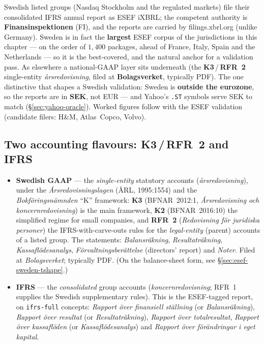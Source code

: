 \documentclass[11pt,a4paper]{report}
\begin{document}
Swedish listed groups (Nasdaq Stockholm and the regulated markets) file their consolidated IFRS annual report
as ESEF iXBRL; the competent authority is \textbf{Finansinspektionen} (FI), and the reports are carried by
filings.xbrl.org (unlike Germany). Sweden is in fact the \textbf{largest} ESEF corpus of the jurisdictions in
this chapter --- on the order of \(1{,}400\) packages, ahead of France, Italy, Spain and the Netherlands --- so
it is the best-covered, and the natural anchor for a validation pass. As elsewhere a national-GAAP layer sits
underneath (the \textbf{K3}\,/\,\textbf{RFR~2} single-entity \emph{\aa rsredovisning}, filed at
\textbf{Bolagsverket}, typically PDF). The one distinctive that shapes a Swedish validation: Sweden is
\textbf{outside the eurozone}, so the reports are in \textbf{SEK}, not EUR --- and Yahoo's \texttt{.ST} symbols
serve SEK to match (\S\ref{sec:yahoo-oracle}). Worked figures follow with the ESEF validation (candidate
filers: H\&M, Atlas~Copco, Volvo).

\subsection{Two accounting flavours: K3\,/\,RFR~2 and IFRS}

\begin{itemize}
  \item \textbf{Swedish GAAP} --- the \emph{single-entity} statutory accounts (\emph{\aa rsredovisning}), under
    the \emph{\AA rsredovisningslagen} (ÅRL, 1995:1554) and the \emph{Bokf\"oringsn\"amnden} ``K'' framework:
    \textbf{K3} (BFNAR~2012:1, \emph{\AA rsredovisning och koncernredovisning}) is the main framework, \textbf{K2}
    (BFNAR~2016:10) the simplified regime for small companies, and \textbf{RFR~2} (\emph{Redovisning f\"or
    juridiska personer}) the IFRS-with-carve-outs rules for the \emph{legal-entity} (parent) accounts of a
    listed group. The statements: \emph{Balansr\"akning}, \emph{Resultatr\"akning}, \emph{Kassafl\"odesanalys},
    \emph{F\"orvaltningsber\"attelse} (directors' report) and \emph{Noter}. Filed at \emph{Bolagsverket};
    typically PDF. (On the balance-sheet form, see \S\ref{sec:esef-sweden-tshape}.)
  \item \textbf{IFRS} --- the \emph{consolidated} group accounts (\emph{koncernredovisning}; RFR~1 supplies the
    Swedish supplementary rules). This is the ESEF-tagged report, on \texttt{ifrs-full} concepts: \emph{Rapport
    \"over finansiell st\"allning} (or \emph{Balansr\"akning}), \emph{Rapport \"over resultat} (or
    \emph{Resultatr\"akning}), \emph{Rapport \"over totalresultat}, \emph{Rapport \"over kassafl\"oden} (or
    \emph{Kassafl\"odesanalys}) and \emph{Rapport \"over f\"or\"andringar i eget kapital}.
\end{itemize}
\end{document}
